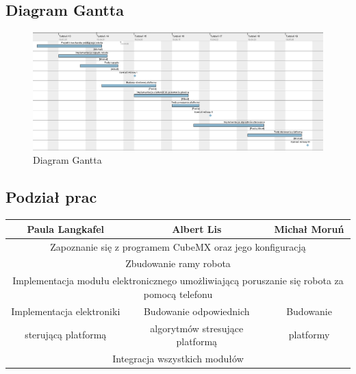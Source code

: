 \documentclass[10pt, a4paper]{article}
\begin{document}
\subsection{Diagram Gantta}

	\begin{figure}[H]
		\centering
		\includegraphics[width=1.1\textwidth]{gantt.png}
		\caption{Diagram Gantta}
		\label{fig:DiagramGantta}
	\end{figure}
\subsection{Podział prac}
\begin{table}[H]
	\centering
	\begin{tabular}{|c|c|c|}
		\hline
		Paula Langkafel                               & Albert Lis                                             & Michał Moruń        \\ \hline
		\multicolumn{3}{|c|}{Zapoznanie się z programem CubeMX oraz jego konfiguracją}                                               \\ \hline
		\multicolumn{3}{|c|}{Zbudowanie ramy robota}                                                                                 \\ \hline
		\multicolumn{3}{|c|}{Implementacja modułu elektronicznego umożliwiającą poruszanie się robota za pomocą telefonu}            \\ \hline
		Implementacja elektroniki  & Budowanie odpowiednich & Budowanie  \\
		 sterującą platformą & algorytmów stresujące platformą &  platformy  \\ \hline
		\multicolumn{3}{|c|}{Integracja wszystkich modułów}                                                                          \\ \hline
	\end{tabular}
\end{table}
\end{document}
